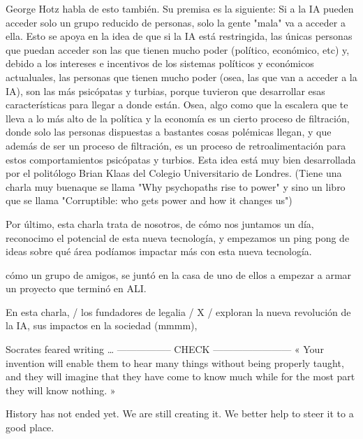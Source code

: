 George Hotz habla de esto también. Su premisa es la siguiente: Si a la IA pueden acceder solo un grupo reducido de personas, 
solo la gente "mala" va a acceder a ella. Esto se apoya en la idea de que si la IA está restringida, las únicas personas
que puedan acceder son las que tienen mucho poder (político, económico, etc) y, debido a los intereses e incentivos de
los sistemas políticos y económicos actualuales, las personas que tienen mucho poder (osea, las que van a acceder a la IA), 
son las más psicópatas y turbias, porque tuvieron que desarrollar esas características para llegar a donde están. Osea, 
algo como que la escalera que te lleva a lo más alto de la política y la economía es un cierto proceso de filtración, 
donde solo las personas dispuestas a bastantes cosas polémicas llegan, y que además de ser un proceso de filtración, 
es un proceso de retroalimentación para estos comportamientos psicópatas y turbios. Esta idea está muy bien desarrollada
por el politólogo Brian Klaas del Colegio Universitario de Londres. (Tiene una charla muy buenaque se llama "Why
psychopaths rise to power" y sino un libro que se llama "Corruptible: who gets power and how it changes us")







Por último, esta charla trata de nosotros, de cómo nos juntamos un día, reconocimo el potencial de esta nueva tecnología, 
y empezamos un ping pong de ideas sobre qué área podíamos impactar más con esta nueva tecnología. 


cómo un grupo de amigos, se juntó en la casa de uno de ellos a empezar a armar un proyecto que terminó en ALI. 


En esta charla, / los fundadores de legalia / X / exploran la nueva revolución de la IA, sus impactos en la sociedad (mmmm), 



Socrates feared writing … ----------------- CHECK ------------------------
« Your invention will enable them to hear many things without being properly taught, and they will 
imagine that they have come to know much while for the most part they will know nothing. »






History has not ended yet. We are still creating it. We better help to steer it to a good place. 





